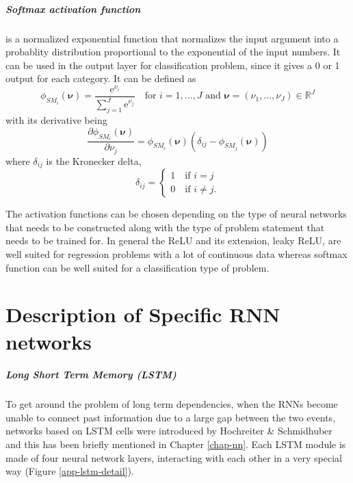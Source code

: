 \paragraph*{Softmax activation function} is a normalized exponential function that normalizes the input argument into a probablity distribution proportional to the exponential of the input numbers. It can be used in the output layer for classification problem, since it gives a 0 or 1 output for each category. It can be defined as 
\begin{equation}\label{app-act-8}
\phi_{SM_i}(\bm\nu)=\frac{\text{e}^{\nu_i}}{\sum_{j=1}^{J}\text{e}^{\nu_j}}\quad\text{for }i=1,...,J\text{ and }\bm\nu=(\nu_1,...,\nu_J)\in\mathbb{R}^J
\end{equation}
with its derivative being
\begin{equation}\label{app-act-8-1}
\frac{\partial\phi_{SM_i}(\bm\nu)}{\partial\nu_j}=\phi_{SM_i}(\bm\nu)(\delta_{ij}-\phi_{SM_j}(\bm\nu))
\end{equation}
where $ \delta_{ij} $ is the Kronecker delta,
\[ \delta_{ij}=\begin{cases}
1\quad\text{if }i=j\\
0\quad\text{if }i\ne j.
\end{cases} \]

The activation functions can be chosen depending on the type of neural networks that needs to be constructed along with the type of problem statement that needs to be trained for. In general the ReLU and its extension, leaky ReLU, are well suited for regression problems with a lot of continuous data whereas softmax function can be well suited for a classification type of problem.

\chapter{Description of Specific RNN networks}\label{app-lstm}
\paragraph*{Long Short Term Memory (LSTM)} To get around the problem of long term dependencies, when the RNNs become unable to connect past information due to a large gap between the two events, networks based on LSTM cells were introduced by Hochreiter \& Schmidhuber\cite{hochreiterLongShortTermMemory1997} and this has been briefly mentioned in Chapter \ref{chap-nn}. Each LSTM module is made of four neural network layers, interacting with each other in a very special way (Figure \ref{app-lstm-detail}).

